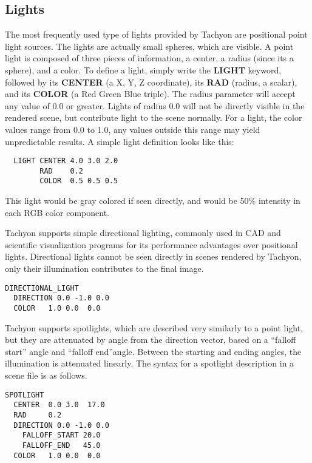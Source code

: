 
\subsection{Lights}
The most frequently used type of lights provided by Tachyon are positional 
point light sources.  The lights are actually small spheres, which are 
visible.  A point light is composed of three pieces of
information, a center, a radius (since its a sphere), and a color.
To define a light, simply write the {\bf LIGHT} keyword, followed by 
its {\bf CENTER} (a X, Y, Z coordinate), its {\bf RAD} (radius, a scalar),
and its {\bf COLOR} (a Red Green Blue triple).  The radius parameter will
accept any value of 0.0 or greater.  Lights of radius 0.0 will not be
directly visible in the rendered scene, but contribute light to the scene
normally. 
For a light, the color values
range from 0.0 to 1.0, any values outside this range may yield unpredictable
results.  A simple light definition looks like this:
\begin{verbatim}
  LIGHT CENTER 4.0 3.0 2.0 
        RAD    0.2 
        COLOR  0.5 0.5 0.5
\end{verbatim}
This light would be gray colored if seen directly, and would be 50\% 
intensity in each RGB color component. 


Tachyon supports simple directional lighting, commonly used in 
CAD and scientific visualization programs for its performance
advantages over positional lights.  Directional lights cannot be
seen directly in scenes rendered by Tachyon, only their illumination 
contributes to the final image.  

\begin{verbatim}
DIRECTIONAL_LIGHT 
  DIRECTION 0.0 -1.0 0.0
  COLOR   1.0 0.0  0.0
\end{verbatim}

Tachyon supports spotlights, which are described very similarly to a 
point light, but they are attenuated by angle from the direction vector,
based on a  ``falloff start'' angle and ``falloff end''angle.  Between
the starting and ending angles, the illumination is attenuated linearly.
The syntax for a spotlight description in a scene file is as follows.
\begin{verbatim}
SPOTLIGHT 
  CENTER  0.0 3.0  17.0 
  RAD     0.2
  DIRECTION 0.0 -1.0 0.0
    FALLOFF_START 20.0
    FALLOFF_END   45.0
  COLOR   1.0 0.0  0.0
\end{verbatim}

